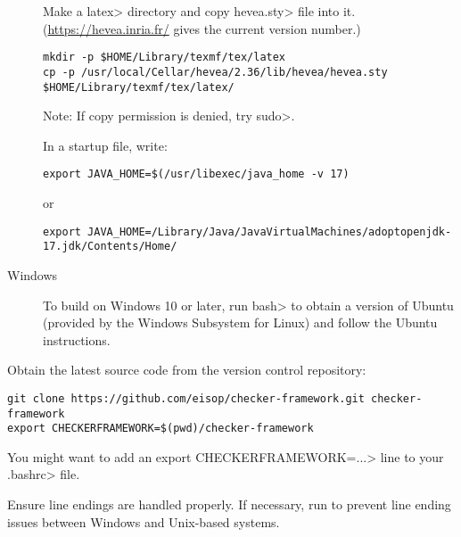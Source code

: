 \begin{description}
Make a \<latex> directory and copy \<hevea.sty> file into it.
(\url{https://hevea.inria.fr/} gives the current version number.)

\begin{Verbatim}
mkdir -p $HOME/Library/texmf/tex/latex
cp -p /usr/local/Cellar/hevea/2.36/lib/hevea/hevea.sty $HOME/Library/texmf/tex/latex/
\end{Verbatim}

Note: If copy permission is denied, try \<sudo>.

In a startup file, write:

\begin{Verbatim}
export JAVA_HOME=$(/usr/libexec/java_home -v 17)
\end{Verbatim}
or
\begin{Verbatim}
export JAVA_HOME=/Library/Java/JavaVirtualMachines/adoptopenjdk-17.jdk/Contents/Home/
\end{Verbatim}


\item[Windows]
  To build on Windows 10 or later,
  run \<bash> to obtain a version of
  Ubuntu (provided by the Windows Subsystem for Linux) and follow the Ubuntu
  instructions.


\end{description}



Obtain the latest source code from the version control repository:

\begin{Verbatim}
git clone https://github.com/eisop/checker-framework.git checker-framework
export CHECKERFRAMEWORK=$(pwd)/checker-framework
\end{Verbatim}

You might want to add an \<export CHECKERFRAMEWORK=...> line to your
\<.bashrc> file.

Ensure line endings are handled properly. If necessary, run
 to prevent line ending issues between
Windows and Unix-based systems.

